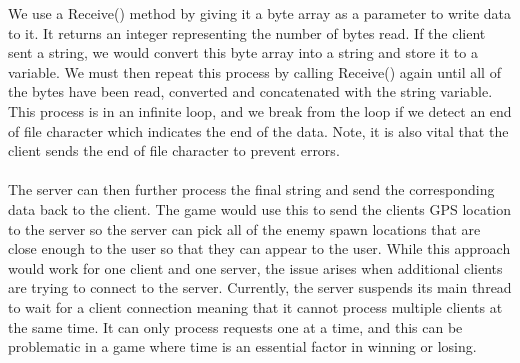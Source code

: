 \documentclass[a4paper]{report}
\begin{document}
We use a Receive() method by giving it a byte array as a parameter to write data to it. It returns an integer representing the number of bytes read. If the client sent a string, we would convert this byte array into a string and store it to a variable. We must then repeat this process by calling Receive() again until all of the bytes have been read, converted and concatenated with the string variable. This process is in an infinite loop, and we break from the loop if we detect an end of file character which indicates the end of the data. Note, it is also vital that the client sends the end of file character to prevent errors.
\\\\
The server can then further process the final string and send the corresponding data back to the client. The game would use this to send the clients GPS location to the server so the server can pick all of the enemy spawn locations that are close enough to the user so that they can appear to the user. While this approach would work for one client and one server, the issue arises when additional clients are trying to connect to the server. Currently, the server suspends its main thread to wait for a client connection meaning that it cannot process multiple clients at the same time. It can only process requests one at a time, and this can be problematic in a game where time is an essential factor in winning or losing.
\end{document}
